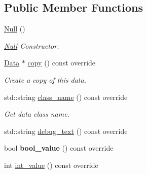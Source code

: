\subsection*{Public Member Functions}
\begin{DoxyCompactItemize}
\item 
\hyperlink{classcreek_1_1_null_a5994ef9340e26066aaa16f2c40259ccc}{Null} ()\hypertarget{classcreek_1_1_null_a5994ef9340e26066aaa16f2c40259ccc}{}\label{classcreek_1_1_null_a5994ef9340e26066aaa16f2c40259ccc}

\begin{DoxyCompactList}\small\item\em {\ttfamily \hyperlink{classcreek_1_1_null}{Null}} Constructor. \end{DoxyCompactList}\item 
\hyperlink{classcreek_1_1_data}{Data} $\ast$ \hyperlink{classcreek_1_1_null_ad5e8a53d3d016ca8cda0b3983c13f4d0}{copy} () const  override\hypertarget{classcreek_1_1_null_ad5e8a53d3d016ca8cda0b3983c13f4d0}{}\label{classcreek_1_1_null_ad5e8a53d3d016ca8cda0b3983c13f4d0}

\begin{DoxyCompactList}\small\item\em Create a copy of this data. \end{DoxyCompactList}\item 
std\+::string \hyperlink{classcreek_1_1_null_ae5914e693c0a81d56c132d48aae340c2}{class\+\_\+name} () const  override\hypertarget{classcreek_1_1_null_ae5914e693c0a81d56c132d48aae340c2}{}\label{classcreek_1_1_null_ae5914e693c0a81d56c132d48aae340c2}

\begin{DoxyCompactList}\small\item\em Get data class name. \end{DoxyCompactList}\item 
std\+::string \hyperlink{classcreek_1_1_null_a27a09414de32a2f76ba5a98cfb565c9a}{debug\+\_\+text} () const  override
\item 
bool {\bfseries bool\+\_\+value} () const  override\hypertarget{classcreek_1_1_null_a6288af6de583f502c513308624b918e2}{}\label{classcreek_1_1_null_a6288af6de583f502c513308624b918e2}

\item 
int \hyperlink{classcreek_1_1_null_aff9d30afa937a3279cfb19af7bcf555e}{int\+\_\+value} () const  override\hypertarget{classcreek_1_1_null_aff9d30afa937a3279cfb19af7bcf555e}{}\label{classcreek_1_1_null_aff9d30afa937a3279cfb19af7bcf555e}


\end{DoxyCompactItemize}
